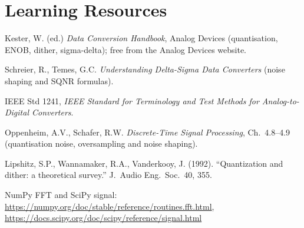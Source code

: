 \documentclass[11pt,a4paper]{article}
\begin{document}
\section*{Learning Resources}
\begin{resources}
  \item Kester, W. (ed.) \emph{Data Conversion Handbook}, Analog Devices (quantisation, ENOB, dither, sigma-delta); free from the Analog Devices website.
  \item Schreier, R., Temes, G.C. \emph{Understanding Delta-Sigma Data Converters} (noise shaping and SQNR formulas).
  \item IEEE Std 1241, \emph{IEEE Standard for Terminology and Test Methods for Analog-to-Digital Converters}.
\end{resources}
\begin{resources}
  \item Oppenheim, A.V., Schafer, R.W. \emph{Discrete-Time Signal Processing}, Ch.~4.8--4.9 (quantisation noise, oversampling and noise shaping).
  \item Lipshitz, S.P., Wannamaker, R.A., Vanderkooy, J. (1992). ``Quantization and dither: a theoretical survey.'' J.\ Audio Eng.\ Soc.\ 40, 355.
\end{resources}
\begin{resources}
  \item NumPy FFT and SciPy signal: \url{https://numpy.org/doc/stable/reference/routines.fft.html}, \url{https://docs.scipy.org/doc/scipy/reference/signal.html}
\end{resources}

\evaluation
\end{document}
